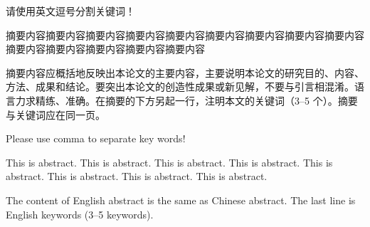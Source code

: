
\begin{cnabstract}
  请使用英文逗号分割关键词！

  摘要内容摘要内容摘要内容摘要内容摘要内容摘要内容摘要内容摘要内容摘要内容摘要内容摘要内容摘要内容摘要内容摘要内容

  摘要内容应概括地反映出本论文的主要内容，主要说明本论文的研究目的、内容、方法、成果和结论。要突出本论文的创造性成果或新见解，不要与引言相混淆。语言力求精练、准确。在摘要的下方另起一行，注明本文的关键词（3--5 个）。摘要与关键词应在同一页。
\end{cnabstract}


\begin{enabstract}
  Please use comma to separate key words!

  This is abstract. This is abstract. This is abstract. This is abstract. This is abstract. This is abstract. This is abstract. This is abstract.

  The content of English abstract is the same as Chinese abstract. The last line is English keywords (3--5 keywords).
\end{enabstract}
